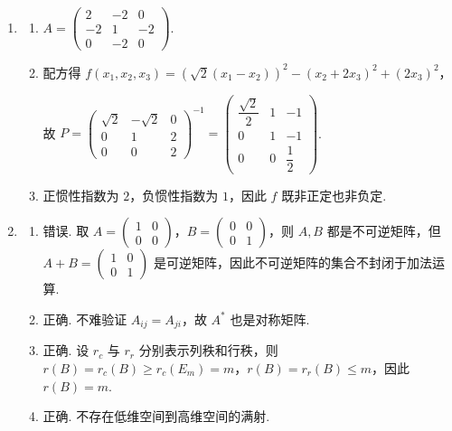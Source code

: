 \begin{enumerate}
\begin{enumerate}
        由于 $m$ 和 $n$ 地位对称，因此若 $\lambda$ 是 $BA$ 的特征值，则 $\lambda$ 也是 $AB$ 的特征值. 得证.

        \item $E_m - AB$ 可逆 $\iff$ $1$ 不是 $AB$ 的特征值 $\iff$ $1$ 不是 $BA$ 的特征值 $\iff$ $E_n - BA$ 可逆.
    \end{enumerate}

    \item \begin{enumerate}
        \item $A=\begin{pmatrix}
            2 & -2 & 0 \\
            -2 & 1 & -2 \\
            0 & -2 & 0
        \end{pmatrix}$.
        \item 配方得 $f(x_1,x_2,x_3) = (\sqrt{2}(x_1-x_2))^2 - (x_2 + 2x_3)^2 + (2x_3)^2$，

        故 $P = \begin{pmatrix}
            \sqrt{2} & -\sqrt{2} & 0 \\
            0 & 1 & 2 \\
            0 & 0 & 2
        \end{pmatrix}^{-1} = \begin{pmatrix}
            \dfrac{\sqrt{2}}{2} & 1 & -1 \\
            0 & 1 & -1 \\
            0 & 0 & \dfrac{1}{2}
        \end{pmatrix}$.
        \item 正惯性指数为 $2$，负惯性指数为 $1$，因此 $f$ 既非正定也非负定.
    \end{enumerate}

    \item \begin{enumerate}
        \item 错误. 取 $A=\begin{pmatrix}
            1 & 0 \\
            0 & 0
        \end{pmatrix}$，$B=\begin{pmatrix}
            0 & 0 \\
            0 & 1
        \end{pmatrix}$，则 $A,B$ 都是不可逆矩阵，但 $A+B=\begin{pmatrix}
            1 & 0 \\
            0 & 1
        \end{pmatrix}$ 是可逆矩阵，因此不可逆矩阵的集合不封闭于加法运算.
        \item 正确. 不难验证 $A_{ij} = A_{ji}$，故 $A^*$ 也是对称矩阵.
        \item 正确. 设 $r_c$ 与 $r_r$ 分别表示列秩和行秩，则 $r(B)=r_c(B) \geqslant r_c(E_m) = m$，$r(B)=r_r(B) \leqslant m$，因此 $r(B)=m$.
        \item 正确. 不存在低维空间到高维空间的满射.
    \end{enumerate}
\end{enumerate}

\clearpage
